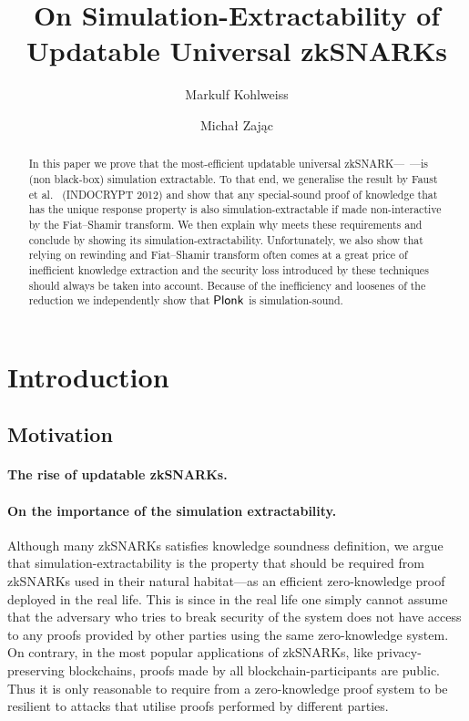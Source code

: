 \let\accentvec\vec \documentclass[runningheads,10pt]{llncs}
\title{On Simulation-Extractability of Updatable Universal zkSNARKs}
\author{Markulf Kohlweiss\inst{1,2} \and Michał Zając\inst{3}} \iflncs{
\institute{University of Edinburgh, Edinburgh, UK \and IOHK \\
\email{mkohlwei@inf.ed.ac.uk} \and Clearmatics, London UK \\
\email{m.p.zajac@gmail.com}} }
\begin{document}
 \sloppy \maketitle

\begin{abstract} In this paper we prove that the most-efficient updatable
		universal zkSNARK---\plonk{}~\cite{EPRINT:GabWilCio19}---is (non black-box)
		simulation extractable.  To that end, we generalise the result by Faust et
		al.~\cite{INDOCRYPT:FKMV12} (INDOCRYPT 2012) and show that any special-sound
		proof of knowledge that has the unique response property is also
		simulation-extractable if made non-interactive by the Fiat--Shamir
		transform.  We then explain why \plonk{} meets these requirements and
		conclude by showing its simulation-extractability.  Unfortunately, we also
		show that relying on rewinding and Fiat--Shamir transform often comes at a
		great price of inefficient knowledge extraction and the security loss
		introduced by these techniques should always be taken into account.  Because
of the inefficiency and loosenes of the reduction we independently show that
$\textnormal{\textsf{Plonk}}{}$ is simulation-sound.  
\end{abstract}

\section{Introduction} \subsection{Motivation} \paragraph{The rise of updatable
zkSNARKs.} \cite{C:GKMMM18} \cite{EC:CHMMVW20} \cite{CCS:MBKM19}
\cite{EPRINT:GabWilCio19} \cite{EPRINT:Gabizon19c} \cite{EPRINT:Lipmaa19a}

\paragraph{On the importance of the simulation extractability.}
Although many zkSNARKs satisfies knowledge soundness definition, we argue that
simulation-extractability is the property that should be required from zkSNARKs
used in their natural habitat---as an efficient zero-knowledge proof deployed in
the real life. This is since in the real life one simply cannot assume that the
adversary who tries to break security of the system does not have access to any
proofs provided by other parties using the same zero-knowledge system. On
contrary, in the most popular applications of zkSNARKs, like privacy-preserving
blockchains, proofs made by all blockchain-participants are public. Thus it is
only reasonable to require from a zero-knowledge proof system to be resilient to
attacks that utilise proofs performed by different parties.
\end{document}

